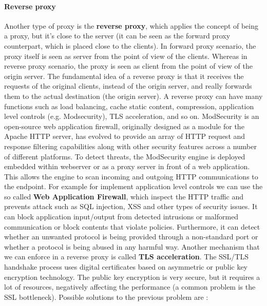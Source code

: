 \documentclass[11pt]{article}
\begin{document}
\paragraph{Reverse proxy} Another type of proxy is the \textbf{reverse proxy}, which applies the concept of being a proxy, but it's close to the server (it can be seen as the forward proxy counterpart, which is placed close to the clients). In forward proxy scenario, the proxy itself is seen as server from the point of view of the clients. Whereas in reverse proxy scenario, the proxy is seen as client from the point of view of the origin server. The fundamental idea of a reverse proxy is that it receives the requests of the original clients, instead of the origin server, and really forwards them to the actual destination (the origin server). A reverse proxy can have many functions such as load balancing, cache static content, compression, application level controls (e.g. Modsecurity), TLS acceleration, and so on. ModSecurity is an open-source web application firewall, originally designed as a module for the Apache HTTP server, has evolved to provide an array of  HTTP request and response filtering capabilities along with other security features across a number of different platforms. To detect threats, the ModSecurity engine is deployed embedded within webserver or as a proxy server in front of a web application. This allows the engine to scan incoming and outgoing HTTP communications to the endpoint. For example for implement application level controls we can use the so called \textbf{Web Application Firewall}, which inspect the HTTP traffic and prevents attack such as SQL injection, XSS and other types of security issues. It can block application input/output from detected intrusions or malformed communication or block contents that violate policies. Furthermore, it can detect whether an unwanted protocol is being provided through a non-standard port or whether a protocol is being abused in any harmful way. Another mechanism that we can enforce in a reverse proxy is called \textbf{TLS acceleration}. The SSL/TLS handshake process uses digital certificates based on asymmetric or public key encryption technology. The public key encryption is very secure, but it requires a lot of resources, negatively affecting the performance (a common problem is the SSL bottleneck). Possible solutions to the previous problem are : 
\end{document}
